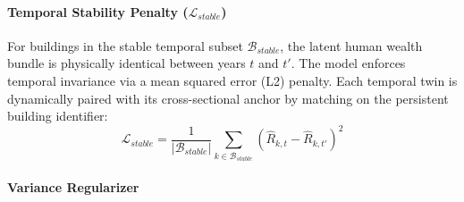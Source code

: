 \documentclass[conference]{IEEEtran}
\begin{document}
\paragraph{Temporal Stability Penalty ($\mathcal{L}_{stable}$)}

For buildings in the stable temporal subset $\mathcal{B}_{stable}$, the latent human wealth bundle is physically identical between years $t$ and $t'$. The model enforces temporal invariance via a mean squared error (L2) penalty. Each temporal twin is dynamically paired with its cross-sectional anchor by matching on the persistent building identifier:
\begin{equation}
\mathcal{L}_{stable} = \frac{1}{|\mathcal{B}_{stable}|} \sum_{k \in \mathcal{B}_{stable}} \left( \hat{R}_{k,t} - \hat{R}_{k,t'} \right)^2
\end{equation}



\paragraph{Variance Regularizer}
\end{document}

